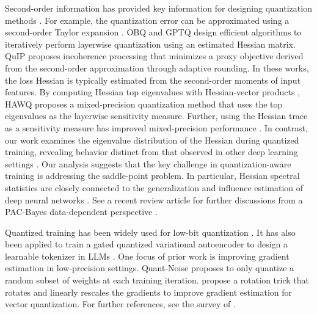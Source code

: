 \documentclass{article}
\theoremstyle{definition}
\begin{document}
Second-order information has provided key information for designing quantization methods \cite{yao2018hessian}. For example, the quantization error can be approximated using a second-order Taylor expansion \cite{kwun2025lotion}.
OBQ \citep{frantar2022optimal} and GPTQ \citep{frantar2023gptq} design efficient algorithms to iteratively perform layerwise quantization using an estimated Hessian matrix.  QuIP \citep{chee2023quip} proposes incoherence processing that minimizes a proxy objective derived from the second-order approximation through adaptive rounding. In these works, the loss Hessian is typically estimated from the second-order moments of input features. By computing Hessian top eigenvalues with Hessian-vector products \citep{yao2020pyhessian}, HAWQ \citep{dong2019hawq} proposes a mixed-precision quantization method that uses the top eigenvalues as the layerwise sensitivity measure. Further, using the Hessian trace as a sensitivity measure has improved mixed-precision performance \citep{dong2020hawq}. 
In contrast, our work examines the eigenvalue distribution of the Hessian during quantized training, revealing behavior distinct from that observed in other deep learning settings \citep{yao2018hessian}. Our analysis suggests that the key challenge in quantization-aware training is addressing the saddle-point problem. In particular, Hessian spectral statistics are closely connected to the generalization and influence estimation of deep neural networks \citep{ju2022robust,zhang2023noise,zhang2025linear,zhang2026efficient}.
See a recent review article for further discussions from a PAC-Bayes data-dependent perspective \cite{wilson2025deep}.

Quantized training has been widely used for low-bit quantization \citep{yin2024modulora}. %
It has also been applied to train a gated quantized variational autoencoder to design a learnable tokenizer in LLMs \citep{datta2025gq}. 
One focus of prior work is improving gradient estimation in low-precision settings. Quant-Noise \citep{fan2021training} proposes to only quantize a random subset of weights at each training iteration.
\citet{fifty2024restructuring} propose a rotation trick that rotates and linearly rescales the gradients to improve gradient estimation for vector quantization. 
For further references, see the survey of \citet{gholami2022survey}.
\end{document}
